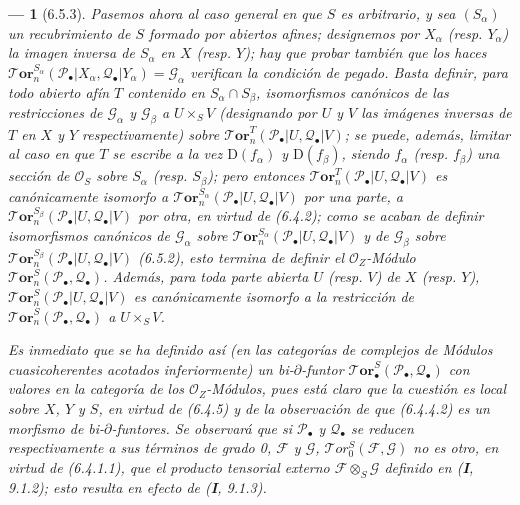 \documentclass[10pt,oneside,openany]{book}
\theoremstyle{egaenv}\newtheorem*{env}{---}
\theoremstyle{egastatement}
\theoremstyle{egadescription}
\begin{document}
\begin{env}[6.5.3]
Pasemos ahora al caso general en que $S$ es arbitrario, y sea $(S_\alpha)$
un recubrimiento de $S$ formado por abiertos afines; designemos por $X_\alpha$
(resp. $Y_\alpha$) la imagen inversa de $S_\alpha$ en $X$ (resp. $Y$);
hay que probar también que los haces
$\boldsymbol{\mathscr{T}\!or}_n^{S_\alpha}
  (\mathscr P_\bullet|X_\alpha,\mathscr Q_\bullet|Y_\alpha)
  =\mathscr G_\alpha$
verifican la condición de pegado. Basta definir, para todo abierto
afín $T$ contenido en $S_\alpha\cap S_\beta$, isomorfismos canónicos de las
restricciones de $\mathscr G_\alpha$ y $\mathscr G_\beta$ a $U\times_S V$ (designando
por $U$ y $V$ las imágenes inversas de $T$ en $X$ y $Y$
respectivamente) sobre
$\boldsymbol{\mathscr{T}\!or}_n^T(\mathscr P_\bullet|U,\mathscr Q_\bullet|V)$; se puede,
además, limitar al caso en que $T$ se escribe a la vez $\mathrm D(f_\alpha)$ y
$\mathrm D(f_\beta)$, siendo $f_\alpha$ (resp. $f_\beta$) una sección de
$\mathscr O_S$ sobre $S_\alpha$ (resp. $S_\beta$); pero entonces
$\boldsymbol{\mathscr{T}\!or}_n^T(\mathscr P_\bullet|U,\mathscr Q_\bullet|V)$ es
canónicamente isomorfo a
$\boldsymbol{\mathscr{T}\!or}_n^{S_\alpha}(\mathscr P_\bullet|U,\mathscr Q_\bullet|V)$
por una parte, a
$\boldsymbol{\mathscr{T}\!or}_n^{S_\beta}(\mathscr P_\bullet|U,\mathscr Q_\bullet|V)$
por otra, en virtud de (6.4.2); como se acaban de definir isomorfismos
canónicos de $\mathscr G_\alpha$ sobre
$\boldsymbol{\mathscr{T}\!or}_n^{S_\alpha}(\mathscr P_\bullet|U,\mathscr Q_\bullet|V)$ y
de $\mathscr G_\beta$ sobre
$\boldsymbol{\mathscr{T}\!or}_n^{S_\beta}(\mathscr P_\bullet|U,\mathscr Q_\bullet|V)$
(6.5.2), esto termina de definir el $\mathscr O_Z$-Módulo
$\boldsymbol{\mathscr{T}\!or}_n^S(\mathscr P_\bullet,\mathscr Q_\bullet)$. Además, para
toda parte abierta $U$ (resp. $V$) de $X$ (resp. $Y$),
$\boldsymbol{\mathscr{T}\!or}_n^S(\mathscr P_\bullet|U,\mathscr Q_\bullet|V)$ es
canónicamente isomorfo a la restricción de
$\boldsymbol{\mathscr{T}\!or}_n^S(\mathscr P_\bullet,\mathscr Q_\bullet)$ a $U\times_S V$.

Es inmediato que se ha definido así (en las categorías de complejos de
Módulos cuasicoherentes acotados inferiormente) un \emph{bi-$\partial$-funtor}
$\boldsymbol{\mathscr{T}\!or}_\bullet^S(\mathscr P_\bullet,\mathscr Q_\bullet)$ con valores
en la categoría de los $\mathscr O_Z$-Módulos, pues está claro que la cuestión
es local sobre $X$, $Y$ y $S$, en virtud de (6.4.5) y de la observación de que
(6.4.4.2) es un morfismo de bi-$\partial$-funtores. Se observará que si
$\mathscr P_\bullet$ y $\mathscr Q_\bullet$ se reducen respectivamente a
sus términos de grado 0, $\mathscr F$ y $\mathscr G$,
$\mathscr{T}\!or_0^S(\mathscr F,\mathscr G)$ no es otro, en virtud de
(6.4.1.1), que el producto tensorial externo $\mathscr F\otimes_S\mathscr G$
definido en (\textbf{I}, 9.1.2); esto resulta en efecto de (\textbf{I}, 9.1.3).
\end{env}
\end{document}

